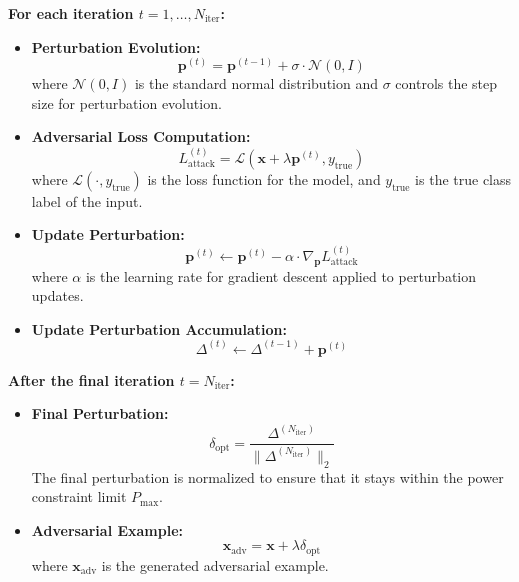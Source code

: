 \textbf{For each iteration \(t = 1, \ldots, N_{\text{iter}}\):}
\begin{itemize}
    \item \textbf{Perturbation Evolution:} 
    \begin{equation}
        \mathbf{p}^{(t)} = \mathbf{p}^{(t-1)} + \sigma \cdot \mathcal{N}(0, I)
    \end{equation}
    where \(\mathcal{N}(0, I)\) is the standard normal distribution and \(\sigma\) controls the step size for perturbation evolution.
    
    \item \textbf{Adversarial Loss Computation:}
    \begin{equation}
        L_{\text{attack}}^{(t)} = \mathcal{L}(\mathbf{x} + \lambda \mathbf{p}^{(t)}, y_{\text{true}})
    \end{equation}
    where \(\mathcal{L}(\cdot, y_{\text{true}})\) is the loss function for the model, and \(y_{\text{true}}\) is the true class label of the input.

    \item \textbf{Update Perturbation:} 
    \begin{equation}
        \mathbf{p}^{(t)} \leftarrow \mathbf{p}^{(t)} - \alpha \cdot \nabla_{\mathbf{p}} L_{\text{attack}}^{(t)}
    \end{equation}
    where \(\alpha\) is the learning rate for gradient descent applied to perturbation updates.
    
    \item \textbf{Update Perturbation Accumulation:}
    \begin{equation}
        \Delta^{(t)} \leftarrow \Delta^{(t-1)} + \mathbf{p}^{(t)}
    \end{equation}
\end{itemize}

\textbf{After the final iteration \(t = N_{\text{iter}}\):}
\begin{itemize}
    \item \textbf{Final Perturbation:}
    \begin{equation}
        \delta_{\text{opt}} = \frac{\Delta^{(N_{\text{iter}})}}{\|\Delta^{(N_{\text{iter}})}\|_2}
    \end{equation}
    The final perturbation is normalized to ensure that it stays within the power constraint limit \(P_{\text{max}}\).
    
    \item \textbf{Adversarial Example:}
    \begin{equation}
        \mathbf{x}_{\text{adv}} = \mathbf{x} + \lambda \delta_{\text{opt}}
    \end{equation}
    where \(\mathbf{x}_{\text{adv}}\) is the generated adversarial example.
\end{itemize}

